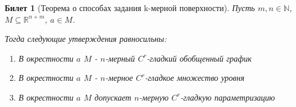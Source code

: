 \documentclass[11pt,a4paper,oneside]{scrartcl}
\newtheorem{ticket}{Билет}
\begin{document}
\addtocounter{ticket}{-1}
\begin{ticket}[Теорема о способах задания k-мерной поверхности]
    Пусть $m, n \in \mathbb{N}$, $M \subseteq \mathbb{R}^{n+m}$, $a \in M$.

    Тогда следующие утверждения равносильны:
    \begin{enumerate}
        \item В окрестности $a$ $M$ - $n$-мерный $C^r$-гладкий обобщенный график
        \item В окрестности $a$ $M$ - $n$-мерное $C^r$-гладкое множество уровня
        \item В окрестности $a$ $M$ допускает $n$-мерную $C^r$-гладкую параметризацию
    \end{enumerate}
\end{ticket}
\end{document}
